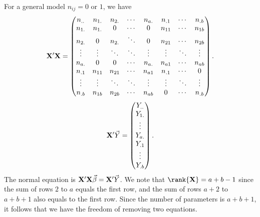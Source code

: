 For a general model $ n_{ij}=0 $ or $ 1 $, we have
\[ \mathbf{X}'\mathbf{X}=\begin{pmatrix}
        n_{..} & n_{1.} & n_{2.} & \cdots & n_{a.} & n_{.1} & \cdots & n_{.b} \\
        n_{1.} & n_{1.} & 0      & \cdots & 0      & n_{11} & \cdots & n_{1b} \\
        n_{2.} & 0      & n_{2.} & \ddots & 0      & n_{21} & \cdots & n_{2b} \\
        \vdots & \vdots & \ddots & \ddots & \vdots & \vdots & \ddots & \vdots \\
        n_{a.} & 0      & 0      & \cdots & n_{a.} & n_{a1} & \cdots & n_{ab} \\
        n_{.1} & n_{11} & n_{21} & \cdots & n_{a1} & n_{.1} & \cdots & 0      \\
        \vdots & \vdots & \ddots & \ddots & \vdots & \vdots & \ddots & \vdots \\
        n_{.b} & n_{1b} & n_{2b} & \cdots & n_{ab} & 0      & \cdots & n_{.b}
    \end{pmatrix}. \]
\[ \mathbf{X}'\vec{Y}=\begin{pmatrix}
        Y_{..} \\
        Y_{1.} \\
        \vdots \\
        Y_{a.} \\
        Y_{.1} \\
        \vdots \\
        Y_{.b}
    \end{pmatrix}. \]
The normal equation is $ \mathbf{X}'\mathbf{X}\vec{\beta}=\mathbf{X}'\vec{Y} $. We
note that $ \rank{\Matrix{X}}=a+b-1 $ since the sum of rows $ 2 $ to $ a $ equals the first row,
and the sum of rows $ a+2 $ to $ a+b+1 $ also equals to the first row. Since the number of parameters
is $ a+b+1 $, it follows that we have the freedom of removing two equations.

